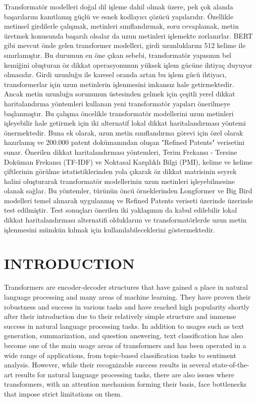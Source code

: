 \documentclass{iyte}
\begin{document}
\begin{ozet}

Transformatör modelleri doğal dil işleme dahil olmak üzere, pek çok alanda başarılarını kanıtlamış güçlü ve esnek kodlayıcı çözücü yapılarıdır. Özellikle metinsel girdilerle çalışmak, metinleri sınıflandırmak, soru cevaplamak, metin üretmek konusunda başarılı olsalar da uzun metinleri işlemekte zorlanırlar. BERT gibi mevcut önde gelen transformer modelleri, girdi uzunluklarını 512 kelime ile sınırlamıştır. Bu durumun en öne çıkan sebebi, transformatör yapısının bel kemiğini oluşturan öz dikkat operasyonunun yüksek işlem gücüne ihtiyaç duyuyor olmasıdır. Girdi uzunluğu ile karesel oranda artan bu işlem gücü ihtiyacı, transformerlar için uzun metinlerin işlenmesini imkansız hale getirmektedir. Ancak metin uzunluğu sorununun üstesinden gelmek için çeşitli yerel dikkat haritalandırma yöntemleri kullanan yeni transformatör yapıları önerilmeye başlanmıştır. Bu çalışma öncelikle transformatör modellerini uzun metinleri işleyebilir hale getirmek için iki alternatif lokal dikkat haritalandırması yöntemi önermektedir. Buna ek olarak, uzun metin sınıflandırma görevi için özel olarak hazırlamış ve 200.000 patent dokümanından oluşan "Refined Patents" verisetini sunar. Önerilen dikkat haritalandırması yöntemleri, Terim Frekansı - Tersine Doküman Frekansı (TF-IDF) ve Noktasal Karşılıklı Bilgi (PMI), kelime ve kelime çiftlerinin görülme istatistiklerinden yola çıkarak öz dikkat matrisinin seyrek halini oluşturarak transformatör modellerinin uzun metinleri işleyebilmesine olanak sağlar. Bu yöntemler, türünün öncü örneklerinden Longformer ve Big Bird modelleri temel alınarak uygulanmış ve Refined Patents veriseti üzerinde üzerinde test edilmiştir. Test sonuçları önerilen iki yaklaşımın da kabul edilebilir lokal dikkat haritalandırması alternatifi olduklarını ve transformatörlerde uzun metin işlenmesini mümkün kılmak için kullanılabileceklerini göstermektedir.
\end{ozet}

\tableofcontents
\newpage
\listoffigures
\newpage
\listoftables
\newpage


\chapter{INTRODUCTION}

Transformers are encoder-decoder structures that have gained a place in natural language processing and many areas of machine learning. They have proven their robustness and success in various tasks and have reached high popularity shortly after their introduction due to their relatively simple structure and immense success in natural language processing tasks. In addition to usages such as text generation, summarization, and question answering, text classification has also become one of the main usage areas of transformers and has been operated in a wide range of applications, from topic-based classification tasks to sentiment analysis. However, while their recognizable success results in several state-of-the-art results for natural language processing tasks, there are also issues where transformers, with an attention mechanism forming their basis, face bottlenecks that impose strict limitations on them.
\end{document}

